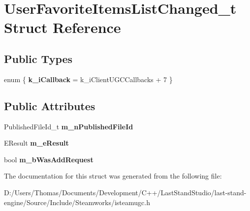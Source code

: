 \hypertarget{structUserFavoriteItemsListChanged__t}{}\section{User\+Favorite\+Items\+List\+Changed\+\_\+t Struct Reference}
\label{structUserFavoriteItemsListChanged__t}
\subsection*{Public Types}
\begin{DoxyCompactItemize}
\item 
\hypertarget{structUserFavoriteItemsListChanged__t_ac836a0ed6b5702c526ac639f749c0bd9}{}enum \{ {\bfseries k\+\_\+i\+Callback} = k\+\_\+i\+Client\+U\+G\+C\+Callbacks + 7
 \}\label{structUserFavoriteItemsListChanged__t_ac836a0ed6b5702c526ac639f749c0bd9}

\end{DoxyCompactItemize}
\subsection*{Public Attributes}
\begin{DoxyCompactItemize}
\item 
\hypertarget{structUserFavoriteItemsListChanged__t_aa74ebdf8ce73a9fe84d49e9393314e3d}{}Published\+File\+Id\+\_\+t {\bfseries m\+\_\+n\+Published\+File\+Id}\label{structUserFavoriteItemsListChanged__t_aa74ebdf8ce73a9fe84d49e9393314e3d}

\item 
\hypertarget{structUserFavoriteItemsListChanged__t_a46e7b5f2b49077a3f42f5a6a6f3b183b}{}E\+Result {\bfseries m\+\_\+e\+Result}\label{structUserFavoriteItemsListChanged__t_a46e7b5f2b49077a3f42f5a6a6f3b183b}

\item 
\hypertarget{structUserFavoriteItemsListChanged__t_a91f0bc429548edf539c357c467ffb8f3}{}bool {\bfseries m\+\_\+b\+Was\+Add\+Request}\label{structUserFavoriteItemsListChanged__t_a91f0bc429548edf539c357c467ffb8f3}

\end{DoxyCompactItemize}


The documentation for this struct was generated from the following file\+:\begin{DoxyCompactItemize}
\item 
D\+:/\+Users/\+Thomas/\+Documents/\+Development/\+C++/\+Last\+Stand\+Studio/last-\/stand-\/engine/\+Source/\+Include/\+Steamworks/isteamugc.\+h\end{DoxyCompactItemize}
